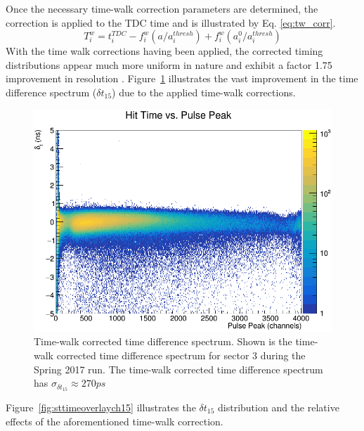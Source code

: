 {Once the necessary time-walk correction parameters are determined, the correction is applied to the TDC time and is illustrated by Eq. \ref{eq:tw_corr}.
	\begin{equation} \label{eq:tw_corr}
		T^{w}_{i} = t^{TDC}_{i} - f^{w}_{i}(a/a^{thresh}_{i}) + f^{w}_{i}(a^{0}_{i}/a^{thresh}_{i})
	\end{equation}
With the time walk corrections having been applied, the corrected timing distributions appear much more uniform in nature and exhibit a factor 1.75 improvement in resolution \cite{pooser16}.  Figure~\ref{fig:twdistcorrch15} illustrates the vast improvement in the time difference spectrum ($\delta t_{15}$) due to the applied time-walk corrections.
	\begin{figure}[!htb]
		\centering
		\includegraphics[width=1.0\columnwidth]{calibration/figs/tw_dist_corr_ch15}
		\caption{Time-walk corrected time difference spectrum.  Shown is the time-walk corrected time difference spectrum for sector 3 during the Spring 2017 run. The time-walk corrected time difference spectrum has $\sigma_{\delta t_{15}} \approx 270 ps$}
		\label{fig:twdistcorrch15}
	\end{figure}
Figure~\ref{fig:sttimeoverlaych15} illustrates the $\delta t_{15}$ distribution and the relative effects of the aforementioned time-walk correction.
	\begin{figure}[!htb]
		\centering

\end{figure}}
